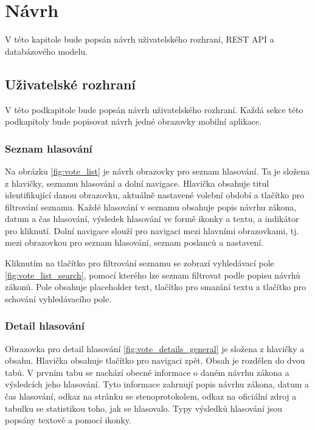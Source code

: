 \chapter{Návrh}

\begin{chapterabstract}
	V této kapitole bude popsán návrh uživatelského rozhraní, REST API a databázového modelu.
\end{chapterabstract}


\section{Uživatelské rozhraní}
V této podkapitole bude popsán návrh uživatelského rozhraní. Každá sekce této podkapitoly bude popisovat návrh jedné obrazovky mobilní aplikace.

\subsection*{Seznam hlasování}
\label{ssec:design-votes}

Na obrázku \ref{fig:vote_list} je návrh obrazovky pro seznam hlasování. Ta je složena z hlavičky, seznamu hlasování a dolní navigace. Hlavička obsahuje titul identifikující danou obrazovku,  aktuálně nastavené volební období a tlačítko pro filtrování seznamu. Každé hlasování v seznamu obsahuje popis návrhu zákona, datum a čas hlasování, výsledek hlasování ve formě ikonky \linebreak a textu, a indikátor pro kliknutí. Dolní navigace slouží pro navigaci mezi hlavními obrazovkami, tj. mezi obrazovkou pro seznam hlasování, seznam poslanců a nastavení.

Kliknutím na tlačítko pro filtrování seznamu se zobrazí vyhledávací pole \ref{fig:vote_list_search}, pomocí kterého lze seznam filtrovat podle popisu návrhů zákonů. Pole obsahuje placeholder text, tlačítko pro smazání textu a tlačítko pro schování vyhledávacího pole.%

\subsection*{Detail hlasování}
\label{ssec:design-vote}

Obrazovka pro detail hlasování \ref{fig:vote_details_general} je složena z hlavičky a obsahu. Hlavička obsahuje tlačítko pro navigaci zpět. Obsah je rozdělen do dvou tabů. V prvním tabu se nachází obecné informace \linebreak o daném návrhu zákona a výsledcích jeho hlasování. Tyto informace zahrnují popis návrhu zákona, datum a čas hlasování, odkaz na stránku se stenoprotokolem, odkaz na oficiální zdroj \linebreak a tabulku se statistikou toho, jak se hlasovalo. Typy výsledků hlasování jsou popsány textově \linebreak a pomocí ikonky.

